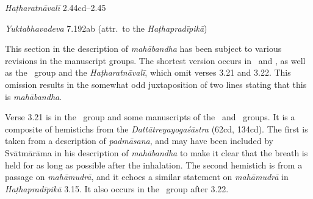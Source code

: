 \begin{ekdosis}
\begin{testimonia}[hp03_021]
\emph{Haṭharatnāvalī} 2.44cd–2.45
\begin{versinnote}
\end{versinnote}

\emph{Yuktabhavadeva} 7.192ab (attr.~to the \emph{Haṭhapradīpikā})
\begin{versinnote}
\end{versinnote}
\end{testimonia}

\begin{philcomm}[hp03_021]
This section in the description of \emph{mahābandha} has been subject to various revisions in the manuscript groups. The shortest version occurs in \alphaOne\ and \alphaTwo, as well as the \textbeta\ group and the \emph{Haṭharatnāvalī}, which omit verses 3.21 and 3.22. This omission results in the somewhat odd juxtaposition of two lines stating that this is \emph{mahābandha}. 

Verse 3.21 is in the \textgamma\ group and some manuscripts of the \textbeta\ and \texteta\ groups. It is a composite of hemistichs from the \emph{Dattātreyayogaśāstra} (62cd, 134cd). The first is taken from a description of \emph{padmāsana}, and may have been included by Svātmārāma in his description of \emph{mahābandha} to make it clear that the breath is held for as long as possible after the inhalation. The second hemistich is from a passage on \emph{mahāmudrā}, and it echoes a similar statement on \emph{mahāmudrā} in \emph{Haṭhapradīpikā} 3.15. It also occurs in the \textalpha\ group after 3.22.
\end{philcomm}



\end{ekdosis}
